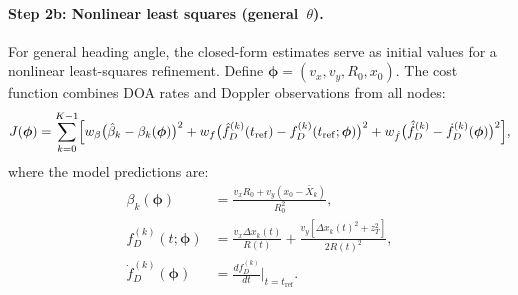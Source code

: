 \documentclass[11pt,a4paper]{article}
\begin{document}
\paragraph{Step 2b: Nonlinear least squares (general~$\theta$).}
For general heading angle, the closed-form estimates serve as
initial values for a nonlinear least-squares refinement.  Define
$\bm{\phi}=(v_x,v_y,R_0,x_0)$.  The cost function combines DOA
rates and Doppler observations from all nodes:
\begin{equation}
  J(\bm{\phi}) =
  \sum_{k=0}^{K-1}\Bigl[
    w_\beta\bigl(\hat{\beta}_k - \beta_k(\bm{\phi})\bigr)^2
    + w_f\bigl(\hat{f}_D^{(k)}(t_{\mathrm{ref}})
    - f_D^{(k)}(t_{\mathrm{ref}};\bm{\phi})\bigr)^2
    + w_{\dot{f}}\bigl(\hat{\dot{f}}_D^{(k)}
    - \dot{f}_D^{(k)}(\bm{\phi})\bigr)^2
  \Bigr],
  \label{eq:nls_cost}
\end{equation}
where the model predictions are:
\begin{align}
  \beta_k(\bm{\phi})
  &= \frac{v_x R_0 + v_y(x_0 - \bar{X}_k)}{R_0^2},
  \label{eq:nls_beta}\\
  f_D^{(k)}(t;\bm{\phi})
  &= \frac{v_x\Delta x_k(t)}{R(t)}
  + \frac{v_y[\Delta x_k(t)^2+z_T^2]}{2R(t)^2},
  \label{eq:nls_fd}\\
  \dot{f}_D^{(k)}(\bm{\phi})
  &= \frac{d f_D^{(k)}}{dt}\bigg|_{t=t_{\mathrm{ref}}}.
  \label{eq:nls_fdot}
\end{align}
\end{document}
